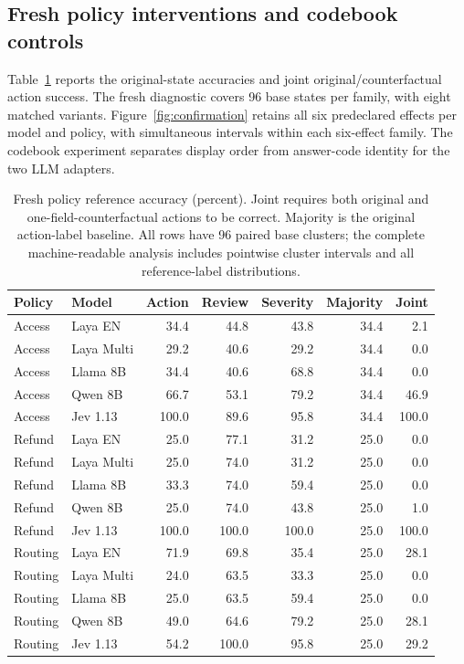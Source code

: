\subsection{Fresh policy interventions and codebook controls}
Table~\ref{tab:fresh} reports the original-state accuracies and joint original/counterfactual action success. The fresh diagnostic covers 96 base states per family, with eight matched variants. Figure~\ref{fig:confirmation} retains all six predeclared effects per model and policy, with simultaneous intervals within each six-effect family. The codebook experiment separates display order from answer-code identity for the two LLM adapters.
\begin{table}[t]
\centering\small
\begin{tabular}{llrrrrr}
\toprule
Policy & Model & Action & Review & Severity & Majority & Joint \\
\midrule
Access & Laya EN & 34.4 & 44.8 & 43.8 & 34.4 & 2.1 \\
Access & Laya Multi & 29.2 & 40.6 & 29.2 & 34.4 & 0.0 \\
Access & Llama 8B & 34.4 & 40.6 & 68.8 & 34.4 & 0.0 \\
Access & Qwen 8B & 66.7 & 53.1 & 79.2 & 34.4 & 46.9 \\
Access & Jev 1.13 & 100.0 & 89.6 & 95.8 & 34.4 & 100.0 \\
Refund & Laya EN & 25.0 & 77.1 & 31.2 & 25.0 & 0.0 \\
Refund & Laya Multi & 25.0 & 74.0 & 31.2 & 25.0 & 0.0 \\
Refund & Llama 8B & 33.3 & 74.0 & 59.4 & 25.0 & 0.0 \\
Refund & Qwen 8B & 25.0 & 74.0 & 43.8 & 25.0 & 1.0 \\
Refund & Jev 1.13 & 100.0 & 100.0 & 100.0 & 25.0 & 100.0 \\
Routing & Laya EN & 71.9 & 69.8 & 35.4 & 25.0 & 28.1 \\
Routing & Laya Multi & 24.0 & 63.5 & 33.3 & 25.0 & 0.0 \\
Routing & Llama 8B & 25.0 & 63.5 & 59.4 & 25.0 & 0.0 \\
Routing & Qwen 8B & 49.0 & 64.6 & 79.2 & 25.0 & 28.1 \\
Routing & Jev 1.13 & 54.2 & 100.0 & 95.8 & 25.0 & 29.2 \\
\bottomrule
\end{tabular}
\caption{Fresh policy reference accuracy (percent). Joint requires both original and one-field-counterfactual actions to be correct. Majority is the original action-label baseline. All rows have 96 paired base clusters; the complete machine-readable analysis includes pointwise cluster intervals and all reference-label distributions.}
\label{tab:fresh}
\end{table}
